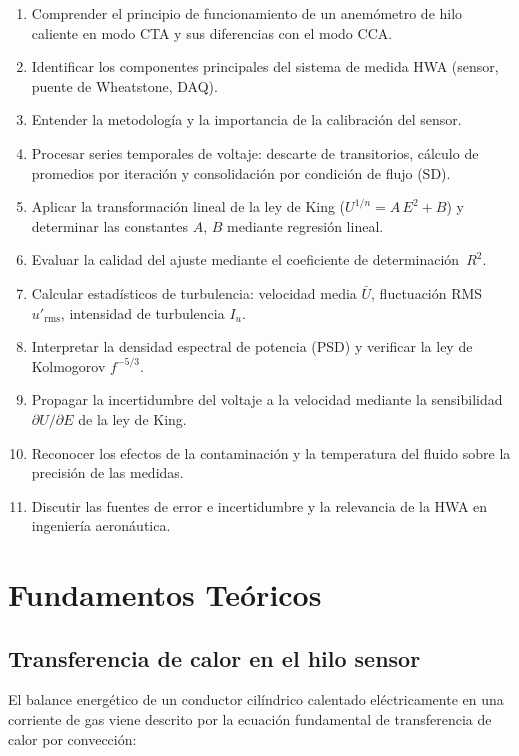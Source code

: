 \documentclass[12pt,a4paper]{article}
\begin{document}
\begin{enumerate}
	\item Comprender el principio de funcionamiento de un anemómetro de hilo
	      caliente en modo CTA y sus diferencias con el modo CCA.
	\item Identificar los componentes principales del sistema de medida HWA
	      (sensor, puente de Wheatstone, DAQ).
	\item Entender la metodología y la importancia de la calibración del
	      sensor.
	\item Procesar series temporales de voltaje: descarte de transitorios,
	      cálculo de promedios por iteración y consolidación por condición de
	      flujo (SD).
	\item Aplicar la transformación lineal de la ley de King
	      ($U^{1/n} = A\,E^2 + B$) y determinar las constantes $A$, $B$
	      mediante regresión lineal.
	\item Evaluar la calidad del ajuste mediante el coeficiente de
	      determinación~$R^2$.
	\item Calcular estadísticos de turbulencia: velocidad media $\bar{U}$,
	      fluctuación RMS $u'_\mathrm{rms}$, intensidad de turbulencia
	      $I_u$.
	\item Interpretar la densidad espectral de potencia (PSD) y verificar la
	      ley de Kolmogorov $f^{-5/3}$.
	\item Propagar la incertidumbre del voltaje a la velocidad mediante la
	      sensibilidad $\partial U/\partial E$ de la ley de King.
	\item Reconocer los efectos de la contaminación y la temperatura del
	      fluido sobre la precisión de las medidas.
	\item Discutir las fuentes de error e incertidumbre y la relevancia de la
	      HWA en ingeniería aeronáutica.
\end{enumerate}

\section{Fundamentos Teóricos}
\label{sec:teoria}

\subsection{Transferencia de calor en el hilo sensor}

El balance energético de un conductor cilíndrico calentado eléctricamente
en una corriente de gas viene descrito por la ecuación fundamental de
transferencia de calor por convección:
\end{document}

